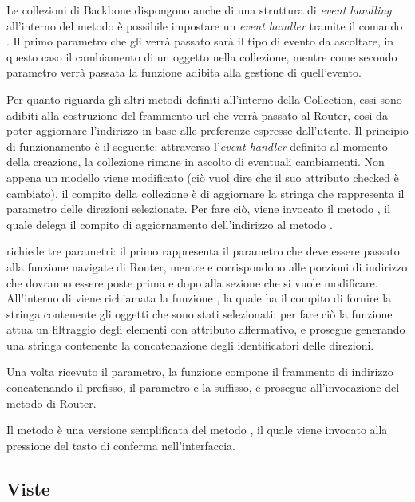 Le collezioni di Backbone dispongono anche di una struttura di {\itshape event handling}: all'interno del metodo  è possibile impostare un {\itshape event handler} tramite il comando . Il primo parametro che gli verrà passato sarà il tipo di evento da ascoltare, in questo caso il cambiamento di un oggetto nella collezione, mentre come secondo parametro verrà passata la funzione adibita alla gestione di quell'evento.

Per quanto riguarda gli altri metodi definiti all'interno della Collection, essi sono adibiti alla costruzione del frammento url che verrà passato al Router, così da poter aggiornare l'indirizzo in base alle preferenze espresse dall'utente.
Il principio di funzionamento è il seguente: attraverso l'{\itshape event handler} definito al momento della creazione, la collezione rimane in ascolto di eventuali cambiamenti. Non appena un modello viene modificato (ciò vuol dire che il suo attributo checked è cambiato), il compito della collezione è di aggiornare la stringa che rappresenta il parametro delle direzioni selezionate. Per fare ciò, viene invocato il metodo , il quale delega il compito di aggiornamento dell'indirizzo al metodo .

  richiede tre parametri: il primo rappresenta il parametro  che deve essere passato alla funzione navigate di Router, mentre  e  corrispondono alle porzioni di indirizzo che dovranno essere poste prima e dopo alla sezione che si vuole modificare.
 All'interno di  viene richiamata la funzione , la quale ha il compito di fornire la stringa contenente gli oggetti che sono stati selezionati: per fare ciò la funzione attua un filtraggio degli elementi con attributo  affermativo, e prosegue generando una stringa contenente la concatenazione degli identificatori delle direzioni.

 Una volta ricevuto il parametro, la funzione  compone il frammento di indirizzo concatenando il prefisso, il parametro e la suffisso, e prosegue all'invocazione del metodo  di Router.

 Il metodo  è una versione semplificata del metodo , il quale viene invocato alla pressione del tasto di conferma nell'interfaccia. 

\subsection{Viste} %
\label{sub:viste}

